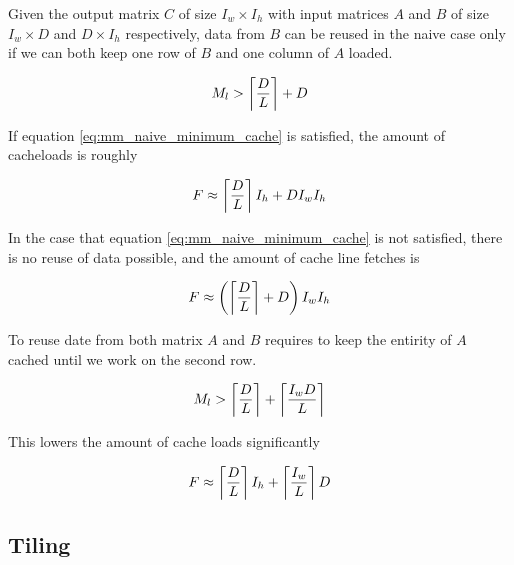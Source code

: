 Given the output matrix $C$ of size $I_w \times I_h$ with input matrices $A$ and $B$ of size $I_w \times D$ and $D \times I_h$ respectively, data from $B$ can be reused in the naive case only if we can both keep one row of $B$ and one column of $A$ loaded.

\begin{equation}
    \label{eq:mm_naive_minimum_cache}
    M_l > \left\lceil \frac{D}{L} \right\rceil + D
\end{equation}

\noindent
If equation \ref{eq:mm_naive_minimum_cache} is satisfied, the amount of cacheloads is roughly

\begin{equation}
    F \approx \left\lceil \frac{D}{L} \right\rceil I_h + D I_w I_h
\end{equation}

\noindent
In the case that equation \ref{eq:mm_naive_minimum_cache} is not satisfied, there is no reuse of data possible, and the amount of cache line fetches is

\begin{equation}
    F \approx \left( \left\lceil \frac{D}{L} \right\rceil + D \right) I_w I_h
\end{equation}

\noindent
To reuse date from both matrix $A$ and $B$ requires to keep the entirity of $A$ cached until we work on the second row.

\begin{equation}
    M_l > \left\lceil \frac{D}{L} \right\rceil + \left\lceil \frac{I_w D}{L} \right\rceil
\end{equation}

\noindent
This lowers the amount of cache loads significantly

\begin{equation}
    F \approx \left\lceil \frac{D}{L} \right\rceil I_h + \left\lceil \frac{I_w}{L} \right\rceil D
\end{equation}


\subsection{Tiling}
